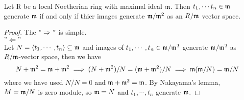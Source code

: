 \begin{prop} \label{local-neotherian-ring-set-gen-max-gen-qoetient-max}
  Let R be a local Noetherian ring with maximal ideal $\mathfrak{m}$. Then $t_1, \cdots t_n
  \in \mathfrak{m}$ generate $\mathfrak{m}$ if and only if thier images generate $\mathfrak{m} / \mathfrak{m}^2$ as an
  $R/\mathfrak{m}$ vector space.
  \begin{proof} \hfill
    The $"\Rightarrow"$ is simple. \\
    $"\Leftarrow"$ \\
    Let $N = \langle t_1, \cdots , t_n\rangle \subseteq \mathfrak{m}$ and images of $t_1, \cdots, t_n
    \in \mathfrak{m} / \mathfrak{m}^2$ generate $\mathfrak{m} / \mathfrak{m}^2$ as $R/\mathfrak{m}$-vector space, then we have
    $$
      N+\mathfrak{m}^2 = \mathfrak{m} + \mathfrak{m}^2 \implies (N + \mathfrak{m}^2) / N = (\mathfrak{m} + \mathfrak{m}^2) / N
      \implies \mathfrak{m}(\mathfrak{m}/N) = \mathfrak{m} / N
    $$
    where we have used $N/N = 0$ and $\mathfrak{m} + \mathfrak{m}^2 = \mathfrak{m}$. By Nakayama's lemma, $M =
     \mathfrak{m} / N$ is zero module, so $\mathfrak{m} = N$ and $t_1, \cdots, t_n$ generate $\mathfrak{m}$.
  \end{proof}
\end{prop}
\fi

